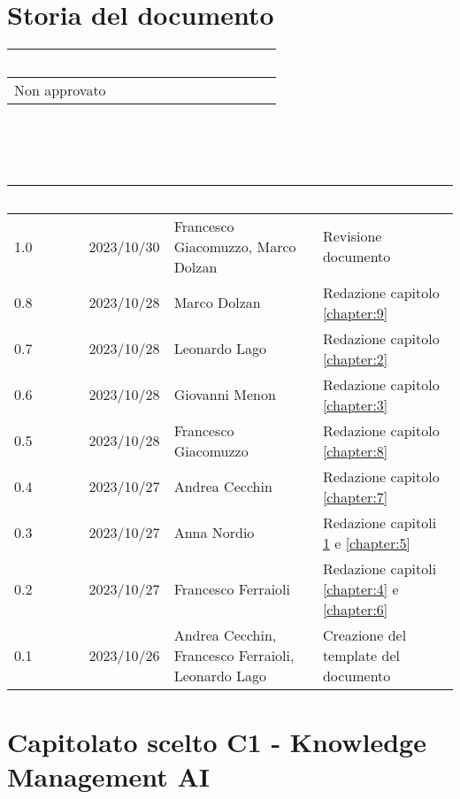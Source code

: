 \documentclass[12pt]{report}
\begin{document}
\chapter*{Storia del documento}
\begingroup
\setlength{\tabcolsep}{10pt}
\renewcommand{\arraystretch}{1.5}
\begin{tabularx}{\textwidth}{| X | X |}
    \hline
    \rowcolor{headerrow} \textbf{\textcolor{white}{Stato del documento}} & \textbf{\textcolor{white}{Responsabile}} \\
    \hline
    Non approvato & \\
    \hline   
\end{tabularx}
\\ \\ \\
\begin{tabularx}{\textwidth}{| l | l | X | X |}
    \hline
    \rowcolor{headerrow} \textbf{\textcolor{white}{Versione}} & \textbf{\textcolor{white}{Data}} & \textbf{\textcolor{white}{Autori}} & \textbf{\textcolor{white}{Descrizione}} \\
    \hline
     1.0 & 2023/10/30 & Francesco Giacomuzzo, Marco Dolzan  & Revisione documento\\
    \hline 
    0.8 & 2023/10/28 & Marco Dolzan  & Redazione capitolo \ref{chapter:9}\\
    \hline
    0.7 & 2023/10/28 & Leonardo Lago  & Redazione capitolo \ref{chapter:2}\\
    \hline
    0.6 & 2023/10/28 & Giovanni Menon  & Redazione capitolo \ref{chapter:3}\\
    \hline
    0.5 & 2023/10/28 & Francesco Giacomuzzo  & Redazione capitolo \ref{chapter:8}\\
    \hline
    0.4 & 2023/10/27 & Andrea Cecchin  & Redazione capitolo \ref{chapter:7}\\
    \hline
    0.3 & 2023/10/27 & Anna Nordio  & Redazione capitoli \ref{chapter:1} e \ref{chapter:5}\\
    \hline
    0.2 & 2023/10/27 & Francesco Ferraioli & Redazione capitoli \ref{chapter:4} e \ref{chapter:6}\\
    \hline
    0.1 & 2023/10/26 &  Andrea Cecchin, Francesco Ferraioli, Leonardo Lago & Creazione del template del documento\\
    \hline
\end{tabularx}
\endgroup

\tableofcontents

\chapter{Capitolato scelto C1 - Knowledge Management AI} \label{chapter:1}
\end{document}
